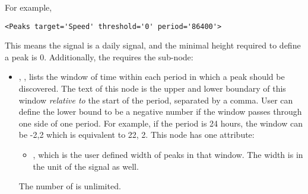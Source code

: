 \begin{itemize}
    	For example,
	\begin{lstlisting}[style=XML,morekeywords={target,threshold,period}]
	<Peaks target='Speed' threshold='0' period='86400'>
	\end{lstlisting}
	This means the  signal is a daily signal, and the minimal height required to define a peak is 0.
    Additionally, the  requires the sub-node:
    	\begin{itemize}
      		 \item {}, ,
		 lists the window of time within each period in which a peak should be discovered.
		 The text of this node is the upper and lower boundary of this
		 window \emph{relative to} the start of the period, separated by a comma.
		 User can define the lower bound to be a negative
		 number if the window passes through one side of one period. For example, if the period is 24
		 hours, the window can be -2,2 which is equivalent to 22, 2.
		 This node has one attribute:
		 \begin{itemize}
		  \item {},  which is the
		 user defined  width of peaks in that window. The width is in the unit of the signal as well.
		 \end{itemize}
		 The number of  is unlimited.
       	\end{itemize}





\end{itemize}
